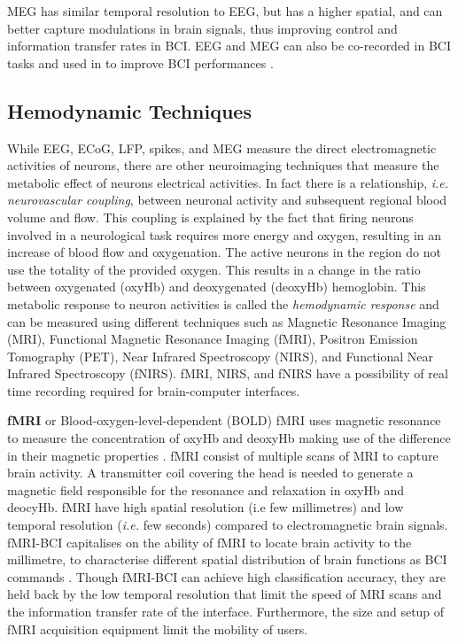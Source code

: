 MEG has similar temporal resolution to EEG, but has a higher spatial, and can better capture modulations in brain signals, thus improving control and information transfer rates in BCI. 
EEG and MEG can also be co-recorded in BCI tasks and used in to improve BCI performances \citep{mellinger_meg-based_2007, henson_parametric_2011, foldes_meg-based_2015}.

\subsection{Hemodynamic Techniques}
\label{optical_sig}

While EEG, ECoG, LFP, spikes, and MEG measure the direct electromagnetic activities of neurons, there are other neuroimaging techniques that measure the metabolic effect of neurons electrical activities.
In fact there is a relationship, \textit{i.e.} \emph{neurovascular coupling}, between neuronal activity and subsequent regional blood volume and flow.
This coupling is explained by the fact that firing neurons involved in a neurological task requires more energy and oxygen, resulting in an increase of blood flow and oxygenation. 
The active neurons in the region do not use the totality of the provided oxygen. 
This results in a change in the ratio between oxygenated (oxyHb) and deoxygenated (deoxyHb) hemoglobin. 
This metabolic response to neuron activities is called the \emph{hemodynamic response} and can be measured using different techniques such as Magnetic Resonance Imaging (MRI), Functional Magnetic Resonance Imaging (fMRI), Positron Emission Tomography (PET), Near Infrared Spectroscopy (NIRS), and Functional Near Infrared Spectroscopy (fNIRS).
fMRI, NIRS, and fNIRS have a possibility of real time recording required for brain-computer interfaces.

\textbf{fMRI} or Blood-oxygen-level-dependent (BOLD) fMRI uses magnetic resonance to measure the concentration of oxyHb and deoxyHb making use of the difference in their magnetic properties \citep{matthews_functional_2004, gosseries_[functional_2008, huettel_functional_2004, sitaram_fmri_2008}.
fMRI consist of multiple scans of MRI to capture brain activity. 
A transmitter coil covering the head is needed to generate a magnetic field responsible for the resonance and relaxation in oxyHb and deocyHb. 
fMRI have high spatial resolution (i.e few millimetres) and low temporal resolution (\textit{i.e.} few seconds) compared to electromagnetic brain signals.
fMRI-BCI capitalises on the ability of fMRI to locate brain activity to the millimetre, to characterise different spatial distribution of brain functions as BCI commands \citep{sitaram_fmri_2007, yoo_braincomputer_2004}. 
Though fMRI-BCI can achieve high classification accuracy, they are held back by the low temporal resolution that limit the speed of MRI scans and the information transfer rate of the interface.
Furthermore, the size and setup of fMRI acquisition equipment limit the mobility of users.

